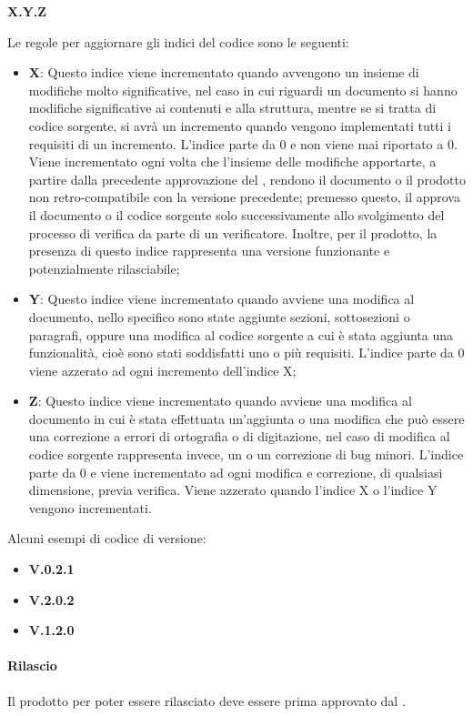 \begin{center}
	\textbf{X.Y.Z}
\end{center}
Le regole per aggiornare gli indici del codice sono le seguenti:
\begin{itemize}
	\item \textbf{X}: Questo indice viene incrementato quando avvengono un insieme di modifiche molto significative, nel caso in cui riguardi un documento si hanno modifiche significative ai contenuti e alla struttura, mentre se si tratta di codice sorgente, si avrà un incremento quando vengono implementati tutti i requisiti di un incremento.
	L'indice parte da 0 e non viene mai riportato a 0. Viene incrementato ogni volta che l'insieme delle modifiche apportarte, a partire dalla precedente approvazione del \Responsabile{}, rendono il documento o il prodotto non retro-compatibile con la versione precedente; premesso questo, il \Responsabile{} approva il documento o il codice sorgente solo successivamente allo svolgimento del processo di verifica da parte di un verificatore. Inoltre, per il prodotto, la presenza di questo indice rappresenta una versione funzionante e potenzialmente rilasciabile; 
	\item \textbf{Y}: Questo indice viene incrementato quando avviene una modifica al documento, nello specifico sono state aggiunte sezioni, sottosezioni o paragrafi, oppure una modifica al codice sorgente a cui è stata aggiunta una funzionalità, cioè sono stati soddisfatti uno o più requisiti.
	L'indice parte da 0 viene azzerato ad ogni incremento dell'indice X;
	\item \textbf{Z}: Questo indice viene incrementato quando avviene una modifica al documento in cui è stata effettuata un'aggiunta o una modifica che può essere una correzione a errori di ortografia o di digitazione, nel caso di modifica al codice sorgente rappresenta invece, un  o un correzione di bug minori.
	L'indice parte da 0 e viene incrementato ad ogni modifica e correzione, di qualsiasi dimensione, previa verifica.
	Viene azzerato quando l'indice X o l'indice Y vengono incrementati.
\end{itemize}
Alcuni esempi di codice di versione:
\begin{itemize}
	\item \textbf{V.0.2.1}
	\item \textbf{V.2.0.2}
	\item \textbf{V.1.2.0}
\end{itemize}
\paragraph*{Rilascio}
Il prodotto per poter essere rilasciato deve essere prima approvato dal \Responsabile{}.

